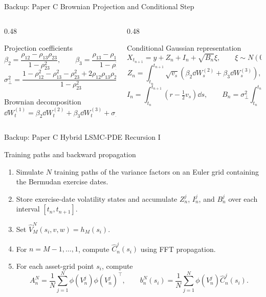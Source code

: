 \begin{frame}{Backup: Paper C Brownian Projection and Conditional Step}
  \begin{columns}[T,onlytextwidth]
    \begin{column}{0.48\textwidth}
      \begin{block}{Projection coefficients}
        {\scriptsize
        \[
        \beta_2=\frac{\rho_{12}-\rho_{13}\rho_{23}}{1-\rho_{23}^2},\qquad
        \beta_3=\frac{\rho_{13}-\rho_{12}\rho_{23}}{1-\rho_{23}^2},
        \]
        \[
        \sigma_\perp^2=\frac{1-\rho_{12}^2-\rho_{13}^2-\rho_{23}^2+2\rho_{12}\rho_{13}\rho_{23}}{1-\rho_{23}^2}.
        \]}
      \end{block}
      \begin{block}{Brownian decomposition}
        {\scriptsize
        \[
        \dd W_t^{(1)}=\beta_2\dd W_t^{(2)}+\beta_3\dd W_t^{(3)}+\sigma_\perp\dd B_t^\perp.
        \]}
      \end{block}
    \end{column}
    \begin{column}{0.48\textwidth}
      \begin{block}{Conditional Gaussian representation}
        {\scriptsize
        \[
        X_{t_{n+1}}=y+Z_n+I_n+\sqrt{B_n}\xi,
        \qquad \xi\sim N(0,1),
        \]
        \[
        Z_n=\int_{t_n}^{t_{n+1}}\sqrt{v_s}(\beta_2\dd W_s^{(2)}+\beta_3\dd W_s^{(3)}),
        \]
        \[
        I_n=\int_{t_n}^{t_{n+1}}(r-\tfrac12v_s)\dd s,
        \qquad
        B_n=\sigma_\perp^2\int_{t_n}^{t_{n+1}}v_s\dd s.
        \]}
      \end{block}
    \end{column}
  \end{columns}
\end{frame}

\begin{frame}{Backup: Paper C Hybrid LSMC-PDE Recursion I}
  \scriptsize
  \begin{block}{Training paths and backward propagation}
    \begin{enumerate}
      \item Simulate \(N\) training paths of the variance factors on an Euler grid containing the Bermudan exercise dates.
      \item Store exercise-date volatility states and accumulate \(Z_n^j\), \(I_n^j\), and \(B_n^j\) over each interval \([t_n,t_{n+1}]\).
      \item Set \(\widehat V_M^N(s_i,v,w)=h_M(s_i)\).
      \item For \(n=M-1,\ldots,1\), compute \(\widehat C_n^j(s_i)\) using FFT propagation.
      \item For each asset-grid point \(s_i\), compute
      \[
      A_n^N=\frac1N\sum_{j=1}^N\phi(V_n^j)\phi(V_n^j)^\top,
      \qquad
      b_n^N(s_i)=\frac1N\sum_{j=1}^N\phi(V_n^j)\widehat C_n^j(s_i).
      \]
    \end{enumerate}
  \end{block}
\end{frame}

